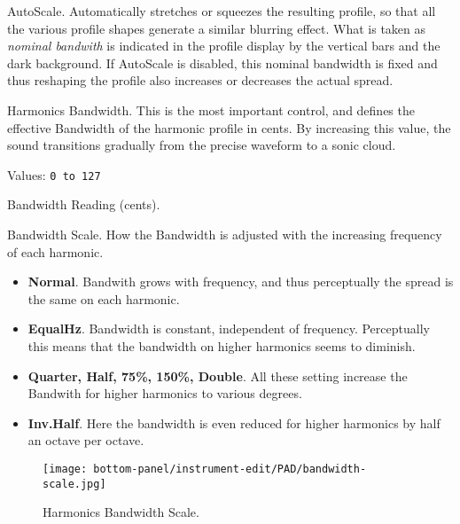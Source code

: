    \setcounter{ItemCounter}{0}      %

   AutoScale.
   Automatically stretches or squeezes the resulting profile, so that all the
   various profile shapes generate a similar blurring effect.
   What is taken as
   \textsl{nominal bandwith} is indicated in the profile display by the vertical
   bars and the dark background.
   If AutoScale is disabled, this nominal bandwidth is fixed
   and thus reshaping the profile also increases or decreases the actual spread.

   Harmonics Bandwidth.
   This is the most important control, and defines the effective Bandwidth of the
   harmonic profile in cents. By increasing this value, the sound transitions
   gradually from the precise waveform to a sonic cloud.

   Values: \texttt{0 to 127}

   Bandwidth Reading (cents).

   Bandwidth Scale.
   How the Bandwidth is adjusted with the increasing frequency of each harmonic.

   \begin{itemize}
      \item \textbf{Normal}.
         Bandwith grows with frequency, and thus perceptually the spread is the same
         on each harmonic.
      \item \textbf{EqualHz}.
         Bandwidth is constant, independent of frequency.
         Perceptually this means that the bandwidth on higher harmonics seems to
         diminish.
      \item \textbf{Quarter, Half, 75\%, 150\%, Double}.
         All these setting increase the Bandwith for higher harmonics to various
         degrees.
      \item \textbf{Inv.Half}.
         Here the bandwidth is even reduced for higher harmonics by half an octave
         per octave.

   \end{itemize}

\begin{figure}[H]
   \centering
   \texttt{[image: bottom-panel/instrument-edit/PAD/bandwidth-scale.jpg]}
   \caption{Harmonics Bandwidth Scale.}
   \label{fig:padsynth_harmonics_bandwidth_scale}
\end{figure}

